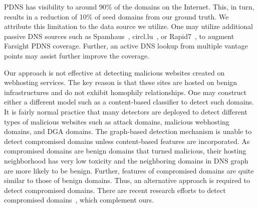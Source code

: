 PDNS has visibility to around 90\% of the domains on the Internet. This, in turn, results in a reduction of 10\% of seed domains from our ground truth. We attribute this limitation to the data source we utilize. One may utilize additional passive DNS sources such as Spamhaus~\cite{Spamhaus}, circl.lu~\cite{Circl}, or Rapid7~\cite{Rapid7}, to augment Farsight PDNS coverage. Further, an active DNS lookup from multiple vantage points may assist further improve the coverage.

Our approach is not effective at detecting malicious websites created on webhosting services. The key reason is that these sites are hosted on benign infrastructures and do not exhibit homophily relationships. One may construct either a different model such as a content-based classifier to detect such domains. It is fairly normal practice that many detectors are deployed to detect different types of malicious websites such as attack domains, malicious webhosting domains, and DGA domains. 
The graph-based detection mechanism is unable to detect compromised domains unless content-based features are incorporated. As compromised domains are benign domains that turned malicious, their hosting neighborhood has very low toxicity and the neighboring domains in DNS graph are more likely to be benign. Further, features of compromised domains are quite similar to those of benign domains. Thus, an alternative approach is required to detect compromised domains. There are recent research efforts to detect compromised domains~\cite{comp_or_at:2021:usenix,comar:esp:2020}, which complement ours. 

